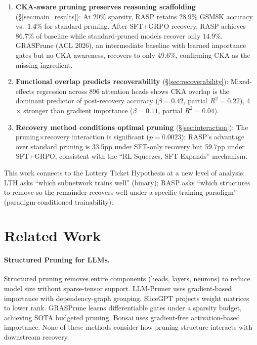 \documentclass[11pt]{article}
\begin{document}
\begin{enumerate}
\item \textbf{CKA-aware pruning preserves reasoning scaffolding} (\S\ref{sec:main_results}): At 20\% sparsity, RASP retains 28.9\% GSM8K accuracy vs.\ 1.4\% for standard pruning.
After SFT+GRPO recovery, RASP achieves 86.7\% of baseline while standard-pruned models recover only 14.9\%.
GRASPrune (ACL 2026), an intermediate baseline with learned importance gates but no CKA awareness, recovers to only 49.6\%, confirming CKA as the missing ingredient.

\item \textbf{Functional overlap predicts recoverability} (\S\ref{sec:recoverability}): Mixed-effects regression across 896 attention heads shows CKA overlap is the dominant predictor of post-recovery accuracy ($\beta = 0.42$, partial $R^2 = 0.22$), 4$\times$ stronger than gradient importance ($\beta = 0.11$, partial $R^2 = 0.04$).

\item \textbf{Recovery method conditions optimal pruning} (\S\ref{sec:interaction}): The pruning$\times$recovery interaction is significant ($p = 0.0023$): RASP's advantage over standard pruning is 33.5pp under SFT-only recovery but 59.7pp under SFT+GRPO, consistent with the ``RL Squeezes, SFT Expands'' mechanism.
\end{enumerate}

This work connects to the Lottery Ticket Hypothesis at a new level of analysis: LTH asks ``which subnetwork trains well'' (binary); RASP asks ``which structures to remove so the remainder recovers well under a specific training paradigm'' (paradigm-conditioned trainability).


\section{Related Work}
\label{sec:related}

\paragraph{Structured Pruning for LLMs.}
Structured pruning removes entire components (heads, layers, neurons) to reduce model size without sparse-tensor support.
LLM-Pruner \citep{llmpruner2023} uses gradient-based importance with dependency-graph grouping.
SliceGPT \citep{slicegpt2024} projects weight matrices to lower rank.
GRASPrune \citep{graspune2026} learns differentiable gates under a sparsity budget, achieving SOTA budgeted pruning.
Bonsai \citep{bonsai2025} uses gradient-free activation-based importance.
None of these methods consider how pruning structure interacts with downstream recovery.
\end{document}
